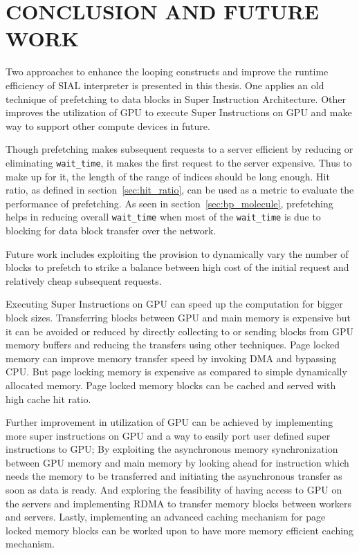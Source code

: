 \chapter{CONCLUSION AND FUTURE WORK}\label{conclusion}
Two approaches to enhance the looping constructs and improve the runtime efficiency
of SIAL interpreter is presented in this thesis. One applies an old technique of
prefetching to data blocks in Super Instruction Architecture. Other improves
the utilization of GPU to execute Super Instructions on GPU and make way to support
other compute devices in future.

Though prefetching makes subsequent requests to a server efficient by reducing or
eliminating \texttt{wait\_time}, it makes the first request to the server expensive.
Thus to make up for it, the length of the range of indices should be long enough. Hit
ratio, as defined in section~\ref{sec:hit_ratio}, can be used as a metric to evaluate
the performance of prefetching. As seen in section~\ref{sec:bp_molecule}, prefetching
helps in reducing overall \texttt{wait\_time} when most of the \texttt{wait\_time}
is due to blocking for data block transfer over the network.

Future work includes exploiting the provision to dynamically vary the number of blocks
to prefetch to strike a balance between high cost of the initial request and relatively
cheap subsequent requests.

Executing Super Instructions on GPU can speed up the computation for bigger block
sizes. Transferring blocks between GPU and main memory is expensive but it can be
avoided or reduced by directly collecting to or sending blocks from GPU memory
buffers and reducing the transfers using other techniques. Page locked memory
can improve memory transfer speed by invoking DMA and bypassing CPU. But page locking
memory is expensive as compared to simple dynamically allocated memory. Page locked
memory blocks can be cached and served with high cache hit ratio.

Further improvement in utilization of GPU can be achieved by implementing more
super instructions on GPU and a way to easily port user defined super instructions
to GPU; By exploiting the asynchronous memory synchronization between GPU memory
and main memory by looking ahead for instruction which needs the memory
to be transferred and initiating the asynchronous transfer as soon as data is ready.
And exploring the feasibility of having access to GPU on the servers and implementing
RDMA to transfer memory blocks between workers and servers. Lastly, implementing
an advanced caching mechanism for page locked memory blocks can be worked upon to have
more memory efficient caching mechanism.